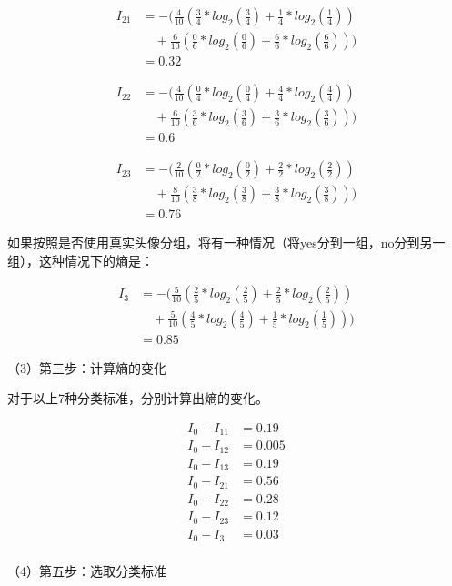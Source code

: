 \documentclass[11pt,a4paper,onecolumn]{article}
\begin{document}
\begin{align*}
	I_{21} &=-(\frac{4}{10}(\frac{3}{4}*log_2(\frac{3}{4})+\frac{1}{4}*log_2(\frac{1}{4})) \\
			&\quad+ \frac{6}{10}(\frac{0}{6}*log_2(\frac{0}{6})+\frac{6}{6}*log_2(\frac{6}{6}))) \\
			&=0.32
\end{align*}

\begin{align*}
	I_{22} &=-(\frac{4}{10}(\frac{0}{4}*log_2(\frac{0}{4})+\frac{4}{4}*log_2(\frac{4}{4})) \\
			&\quad+ \frac{6}{10}(\frac{3}{6}*log_2(\frac{3}{6})+\frac{3}{6}*log_2(\frac{3}{6}))) \\
			&=0.6
\end{align*}

\begin{align*}
	I_{23} &=-(\frac{2}{10}(\frac{0}{2}*log_2(\frac{0}{2})+\frac{2}{2}*log_2(\frac{2}{2})) \\
			&\quad+ \frac{8}{10}(\frac{3}{8}*log_2(\frac{3}{8})+\frac{3}{8}*log_2(\frac{3}{8}))) \\
			&=0.76
\end{align*}

如果按照是否使用真实头像分组，将有一种情况（将yes分到一组，no分到另一组），这种情况下的熵是：

\begin{align*}
	I_3 &= -(\frac{5}{10}(\frac{2}{5}*log_2(\frac{2}{5})+\frac{2}{5}*log_2(\frac{2}{5})) \\
			&\quad+ \frac{5}{10}(\frac{4}{5}*log_2(\frac{4}{5})+\frac{1}{5}*log_2(\frac{1}{5}))) \\
			&=0.85
\end{align*}

（3）第三步：计算熵的变化

对于以上7种分类标准，分别计算出熵的变化。

\begin{align*}
	I_0-I_{11} &=0.19 \\
	I_0-I_{12} &=0.005 \\
	I_0-I_{13} &=0.19 \\
	I_0-I_{21} &=0.56 \\
	I_0-I_{22} &=0.28 \\
	I_0-I_{23} &=0.12 \\
	I_0-I_3 &=0.03 \\
\end{align*}

（4）第五步：选取分类标准
\end{document}
